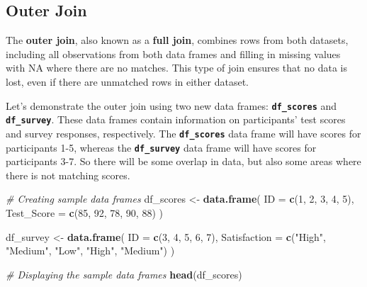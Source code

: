 \documentclass[
]{book}
\newenvironment{Shaded}{\begin{snugshade}}{\end{snugshade}}
\newcommand{\AttributeTok}[1]{\textcolor[rgb]{0.13,0.29,0.53}{#1}}
\newcommand{\CommentTok}[1]{\textcolor[rgb]{0.56,0.35,0.01}{\textit{#1}}}
\newcommand{\DecValTok}[1]{\textcolor[rgb]{0.00,0.00,0.81}{#1}}
\newcommand{\FunctionTok}[1]{\textcolor[rgb]{0.13,0.29,0.53}{\textbf{#1}}}
\newcommand{\NormalTok}[1]{#1}
\newcommand{\OtherTok}[1]{\textcolor[rgb]{0.56,0.35,0.01}{#1}}
\newcommand{\StringTok}[1]{\textcolor[rgb]{0.31,0.60,0.02}{#1}}
\begin{document}
\subsection{Outer Join}\label{outer-join}

The \textbf{outer join}, also known as a \textbf{full join}, combines rows from both datasets, including all observations from both data frames and filling in missing values with NA where there are no matches. This type of join ensures that no data is lost, even if there are unmatched rows in either dataset.

Let's demonstrate the outer join using two new data frames: \textbf{\texttt{df\_scores}} and \textbf{\texttt{df\_survey}}. These data frames contain information on participants' test scores and survey responses, respectively. The \textbf{\texttt{df\_scores}} data frame will have scores for participants 1-5, whereas the \textbf{\texttt{df\_survey}} data frame will have scores for participants 3-7. So there will be some overlap in data, but also some areas where there is not matching scores.

\begin{Shaded}
\begin{Highlighting}[]
\CommentTok{\# Creating sample data frames}
\NormalTok{df\_scores }\OtherTok{\textless{}{-}} \FunctionTok{data.frame}\NormalTok{(}
  \AttributeTok{ID =} \FunctionTok{c}\NormalTok{(}\DecValTok{1}\NormalTok{, }\DecValTok{2}\NormalTok{, }\DecValTok{3}\NormalTok{, }\DecValTok{4}\NormalTok{, }\DecValTok{5}\NormalTok{),}
  \AttributeTok{Test\_Score =} \FunctionTok{c}\NormalTok{(}\DecValTok{85}\NormalTok{, }\DecValTok{92}\NormalTok{, }\DecValTok{78}\NormalTok{, }\DecValTok{90}\NormalTok{, }\DecValTok{88}\NormalTok{)}
\NormalTok{)}

\NormalTok{df\_survey }\OtherTok{\textless{}{-}} \FunctionTok{data.frame}\NormalTok{(}
  \AttributeTok{ID =} \FunctionTok{c}\NormalTok{(}\DecValTok{3}\NormalTok{, }\DecValTok{4}\NormalTok{, }\DecValTok{5}\NormalTok{, }\DecValTok{6}\NormalTok{, }\DecValTok{7}\NormalTok{),}
  \AttributeTok{Satisfaction =} \FunctionTok{c}\NormalTok{(}\StringTok{"High"}\NormalTok{, }\StringTok{"Medium"}\NormalTok{, }\StringTok{"Low"}\NormalTok{, }\StringTok{"High"}\NormalTok{, }\StringTok{"Medium"}\NormalTok{)}
\NormalTok{)}

\CommentTok{\# Displaying the sample data frames}
\FunctionTok{head}\NormalTok{(df\_scores)}
\end{Highlighting}
\end{Shaded}
\end{document}
